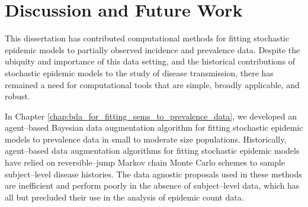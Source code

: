 \chapter{Discussion and Future Work}
\label{chap:conclusion}

This dissertation has contributed computational methods for fitting stochastic epidemic models to partially observed incidence and prevalence data. Despite the ubiquity and importance of this data setting, and the historical contributions of stochastic epidemic models to the study of disease transmission, there has remained a need for computational tools that are simple, broadly applicable, and robust. 

In Chapter \ref{chap:bda_for_fitting_sems_to_prevalence_data}, we developed an agent--based Bayesian data augmentation algorithm for fitting stochastic epidemic models to prevalence data in small to moderate size populations. Historically, agent--based data augmentation algorithms for fitting stochastic epidemic models have relied on reversible--jump Markov chain Monte Carlo schemes to sample subject--level disease histories. The data agnostic proposals used in these methods are inefficient and perform poorly in the absence of subject--level data, which has all but precluded their use in the analysis of epidemic count data. 